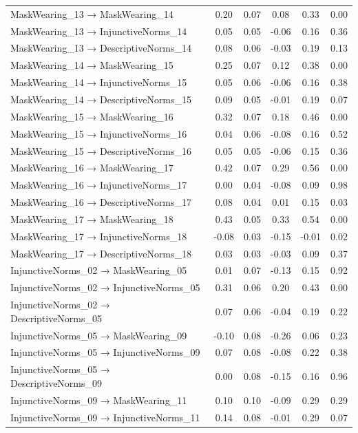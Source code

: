 \documentclass[
  man, donotrepeattitle,floatsintext]{apa6}
\begin{document}
\begin{center}
\begin{ThreePartTable}
{\begin{longtable}{lccccc}
MaskWearing\_13 → MaskWearing\_14 & 0.20 & 0.07 & 0.08 & 0.33 & 0.00\\
MaskWearing\_13 → InjunctiveNorms\_14 & 0.05 & 0.05 & -0.06 & 0.16 & 0.36\\
MaskWearing\_13 → DescriptiveNorms\_14 & 0.08 & 0.06 & -0.03 & 0.19 & 0.13\\
MaskWearing\_14 → MaskWearing\_15 & 0.25 & 0.07 & 0.12 & 0.38 & 0.00\\
MaskWearing\_14 → InjunctiveNorms\_15 & 0.05 & 0.06 & -0.06 & 0.16 & 0.38\\
MaskWearing\_14 → DescriptiveNorms\_15 & 0.09 & 0.05 & -0.01 & 0.19 & 0.07\\
MaskWearing\_15 → MaskWearing\_16 & 0.32 & 0.07 & 0.18 & 0.46 & 0.00\\
MaskWearing\_15 → InjunctiveNorms\_16 & 0.04 & 0.06 & -0.08 & 0.16 & 0.52\\
MaskWearing\_15 → DescriptiveNorms\_16 & 0.05 & 0.05 & -0.06 & 0.15 & 0.36\\
MaskWearing\_16 → MaskWearing\_17 & 0.42 & 0.07 & 0.29 & 0.56 & 0.00\\
MaskWearing\_16 → InjunctiveNorms\_17 & 0.00 & 0.04 & -0.08 & 0.09 & 0.98\\
MaskWearing\_16 → DescriptiveNorms\_17 & 0.08 & 0.04 & 0.01 & 0.15 & 0.03\\
MaskWearing\_17 → MaskWearing\_18 & 0.43 & 0.05 & 0.33 & 0.54 & 0.00\\
MaskWearing\_17 → InjunctiveNorms\_18 & -0.08 & 0.03 & -0.15 & -0.01 & 0.02\\
MaskWearing\_17 → DescriptiveNorms\_18 & 0.03 & 0.03 & -0.03 & 0.09 & 0.37\\
InjunctiveNorms\_02 → MaskWearing\_05 & 0.01 & 0.07 & -0.13 & 0.15 & 0.92\\
InjunctiveNorms\_02 → InjunctiveNorms\_05 & 0.31 & 0.06 & 0.20 & 0.43 & 0.00\\
InjunctiveNorms\_02 → DescriptiveNorms\_05 & 0.07 & 0.06 & -0.04 & 0.19 & 0.22\\
InjunctiveNorms\_05 → MaskWearing\_09 & -0.10 & 0.08 & -0.26 & 0.06 & 0.23\\
InjunctiveNorms\_05 → InjunctiveNorms\_09 & 0.07 & 0.08 & -0.08 & 0.22 & 0.38\\
InjunctiveNorms\_05 → DescriptiveNorms\_09 & 0.00 & 0.08 & -0.15 & 0.16 & 0.96\\
InjunctiveNorms\_09 → MaskWearing\_11 & 0.10 & 0.10 & -0.09 & 0.29 & 0.29\\
InjunctiveNorms\_09 → InjunctiveNorms\_11 & 0.14 & 0.08 & -0.01 & 0.29 & 0.07\\

\end{longtable}}
\end{ThreePartTable}
\end{center}
\end{document}
